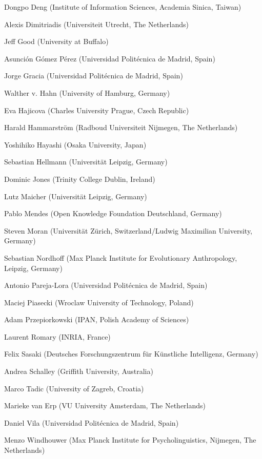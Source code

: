 \documentclass[10pt, a4paper]{article}
\begin{document}
\begin{figure*}[t]
\begin{minipage}{\textwidth}
Dongpo Deng (Institute of Information Sciences, Academia Sinica, Taiwan)

Alexis Dimitriadis (Universiteit Utrecht, The Netherlands)

Jeff Good (University at Buffalo)

Asunción Gómez Pérez (Universidad Politécnica de Madrid, Spain)

Jorge Gracia (Universidad Politécnica de Madrid, Spain)

Walther v. Hahn (University of Hamburg, Germany)

Eva Hajicova (Charles University Prague, Czech Republic)

Harald Hammarström (Radboud Universiteit Nijmegen, The Netherlands)

Yoshihiko Hayashi (Osaka University, Japan)

Sebastian Hellmann (Universität Leipzig, Germany)

Dominic Jones (Trinity College Dublin, Ireland)

Lutz Maicher (Universität Leipzig, Germany)

Pablo Mendes (Open Knowledge Foundation Deutschland, Germany)

Steven Moran (Universität Zürich, Switzerland/Ludwig Maximilian University, Germany)

Sebastian Nordhoff (Max Planck Institute for Evolutionary Anthropology, Leipzig, Germany)

Antonio Pareja-Lora (Universidad Politécnica de Madrid, Spain)

Maciej Piasecki (Wroclaw University of Technology, Poland)

Adam Przepiorkowski (IPAN, Polish Academy of Sciences)

Laurent Romary (INRIA, France)

Felix Sasaki (Deutsches Forschungszentrum für Künstliche Intelligenz, Germany)

Andrea Schalley (Griffith University, Australia)

Marco Tadic (University of Zagreb, Croatia)

Marieke van Erp (VU University Amsterdam, The Netherlands)

Daniel Vila (Universidad Politécnica de Madrid, Spain)

Menzo Windhouwer (Max Planck Institute for Psycholinguistics, Nijmegen, The Netherlands)

\end{minipage}
\end{figure*}
\end{document}
